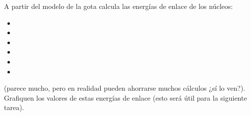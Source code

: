 \documentclass[./../main.tex]{subfiles}
\begin{document}
    \begin{exercise}
        A partir del modelo de la gota calcula las energías de enlace de los núcleos:

        \begin{itemize}
            \item {}
            \item {}
            \item {}
            \item {}
            \item {}
            \item {}
        \end{itemize}

        (parece mucho, pero en realidad pueden ahorrarse muchos cálculos ¿sí lo ven?). Grafiquen los valores de estas energías de enlace (esto será útil para la siguiente tarea).
    \end{exercise}
\end{document}
